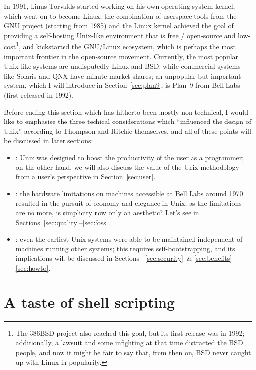 In 1991, Linus Torvalds started working on his own operating system kernel,
which went on to become Linux; the combination of userspace tools from the
GNU project (starting from 1985) and the Linux kernel achieved the goal of
providing a self-hosting Unix-like environment that is free / open-source and
low-cost\footnote{The 386BSD project also reached this goal, but its first
release was in 1992; additionally, a lawsuit and some infighting at that
time distracted the BSD people, and now it might be
fair to say that, from then on, BSD never caught up with Linux in popularity.},
and kickstarted the GNU/Linux ecosystem, which is perhaps the most important
frontier in the open-source movement.  Currently, the most popular Unix-like
systems are undisputedly Linux and BSD, while commercial systems like Solaris
and QNX have minute market shares; an unpopular but important system,
which I will introduce in Section~\ref{sec:plan9}, is Plan~9
from Bell Labs (first released in 1992).

Before ending this section which has hitherto been mostly non-technical,
I would like to emphasise the three techical considerations which
``influenced the design of Unix'' according to Thompson and Ritchie
themselves, and all of these points
will be discussed in later sections:
\begin{itemize}
\item {}: Unix was designed to boost
	the productivity of the user as a programmer; on the other hand,
	we will also discuss the value of the Unix methodology from
	a user's perspective in Section~\ref{sec:user}.
\item {}: the hardware limitations on machines accessible
	at Bell Labs around 1970 resulted in the pursuit of economy and elegance
	in Unix; as the limitations are no more, is simplicity now only an
	aesthetic?  Let's see in Sections~\ref{sec:quality}--\ref{sec:foss}.
\item {}: even the earliest Unix systems were able to be
	maintained independent of machines running other systems; this requires
	self-bootstrapping, and its implications will be discussed in Sections~%
	\ref{sec:security}~\& \ref{sec:benefits}--\ref{sec:howto}.
\end{itemize}

\section{A taste of shell scripting}\label{sec:shell}

